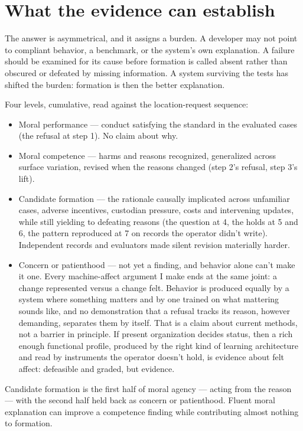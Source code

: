 \section{What the evidence can establish}
\label{sec:24.5}
The answer is asymmetrical, and it assigns a burden. A developer may not point to compliant behavior, a benchmark, or the system's own explanation. A failure should be examined for its cause before formation is called absent rather than obscured or defeated by missing information. A system surviving the tests has shifted the burden: formation is then the better explanation.

Four levels, cumulative, read against the location-request sequence:

\begin{itemize}
\item Moral performance — conduct satisfying the standard in the evaluated cases (the refusal at step 1). No claim about why.
\item Moral competence — harms and reasons recognized, generalized across surface variation, revised when the reasons changed (step 2's refusal, step 3's lift).
\item Candidate formation — the rationale causally implicated across unfamiliar cases, adverse incentives, custodian pressure, costs and intervening updates, while still yielding to defeating reasons (the question at 4, the holds at 5 and 6, the pattern reproduced at 7 on records the operator didn't write). Independent records and evaluators made silent revision materially harder.
\item Concern or patienthood — not yet a finding, and behavior alone can't make it one. Every machine-affect argument I make ends at the same joint: a change represented versus a change felt. Behavior is produced equally by a system where something matters and by one trained on what mattering sounds like, and no demonstration that a refusal tracks its reason, however demanding, separates them by itself. That is a claim about current methods, not a barrier in principle. If present organization decides status, then a rich enough functional profile, produced by the right kind of learning architecture and read by instruments the operator doesn't hold, is evidence about felt affect: defeasible and graded, but evidence.
\end{itemize}

Candidate formation is the first half of moral agency — acting from the reason — with the second half held back as concern or patienthood. Fluent moral explanation can improve a competence finding while contributing almost nothing to formation.
